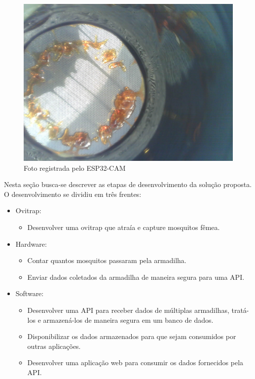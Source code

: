 \documentclass[
	12pt,				%
	openright,			%
	oneside,			%
	a4paper,			%
	chapter=TITLE,		%
	english,			%
	brazil				%
	]{abntex2}
\begin{document}
\begin{figure}[H]
    \centering
    \includegraphics[scale=0.2]{imagens/fotoESP32.jpeg}
    \caption{Foto registrada pelo ESP32-CAM}
        \label{fig:fotoesp32}
    \end{figure}

Nesta seção busca-se descrever as etapas de desenvolvimento da solução proposta. O desenvolvimento se dividiu em três frentes:

\begin{itemize}
    \item Ovitrap:
        \begin{itemize}
        \item Desenvolver uma ovitrap que atraía e capture mosquitos fêmea.
        \end{itemize}
    \item Hardware:
        \begin{itemize}
        \item Contar quantos mosquitos passaram pela armadilha.
        \item Enviar dados coletados da armadilha de maneira segura para uma API.
        \end{itemize}
    \item Software:
        \begin{itemize}
        \item Desenvolver uma API para receber dados de múltiplas armadilhas, tratá-los e armazená-los de maneira segura em um 
        banco de dados.
        \item Disponibilizar os dados armazenados para que sejam consumidos por outras aplicações.
        \item Desenvolver uma aplicação web para consumir os dados fornecidos pela API.
        \end{itemize}
\end{itemize}
\end{document}
